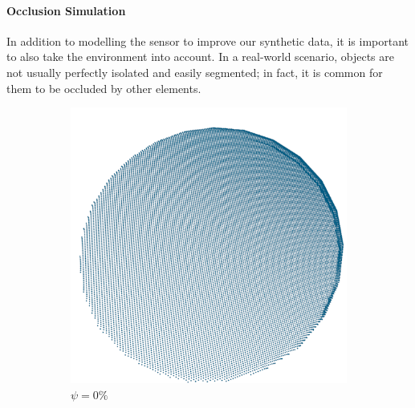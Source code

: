 \paragraph{Occlusion Simulation}

In addition to modelling the sensor to improve our synthetic data, it is important to also take the environment into account. In a real-world scenario, objects are not usually perfectly isolated and easily segmented; in fact, it is common for them to be occluded by other elements.

\begin{figure}[!htb]
	\centering
	\hfill
	\begin{subfigure}{0.32\textwidth}
		\centering
		\includegraphics[width=\linewidth]{Figures/ObjRecog/occlusion_0}
		\caption{$\psi=0\%$}
		\label{subfig:objrecog:occlusion:0}
	\end{subfigure}
	\hfill
	\begin{subfigure}{0.32\textwidth}
		\centering

\end{subfigure}
\end{figure}
